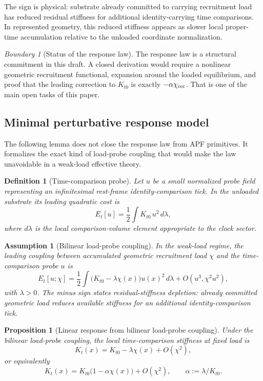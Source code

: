 \documentclass[11pt]{article}
\newtheorem{proposition}[theorem]{Proposition}
\newtheorem{definition}[theorem]{Definition}
\newtheorem{assumption}[theorem]{Assumption}
\theoremstyle{remark}
\newtheorem{warning}[theorem]{Boundary}
\begin{document}
The sign is physical: substrate already committed to carrying recruitment load has reduced residual stiffness for additional identity-carrying time comparisons.  In represented geometry, this reduced stiffness appears as slower local proper-time accumulation relative to the unloaded coordinate normalization.

\begin{warning}[Status of the response law]
The response law is a structural commitment in this draft.  A closed derivation would require a nonlinear geometric recruitment functional, expansion around the loaded equilibrium, and proof that the leading correction to \(K_{t0}\) is exactly \(-\alpha\chi_{\rm rec}\).  That is one of the main open tasks of this paper.
\end{warning}

\subsection{Minimal perturbative response model}

The following lemma does not close the response law from APF primitives.  It formalizes the exact kind of load-probe coupling that would make the law unavoidable in a weak-load effective theory.

\begin{definition}[Time-comparison probe]
Let \(u\) be a small normalized probe field representing an infinitesimal rest-frame identity-comparison tick.  In the unloaded substrate its leading quadratic cost is
\[
        E_t[u]=\frac12\int K_{t0}\,u^2\,d\lambda,
\]
where \(d\lambda\) is the local comparison-volume element appropriate to the clock sector.
\end{definition}

\begin{assumption}[Bilinear load-probe coupling]
In the weak-load regime, the leading coupling between accumulated geometric recruitment load \(\chi\) and the time-comparison probe \(u\) is
\[
        E_t[u;\chi]
        =\frac12\int \bigl(K_{t0}-\lambda\chi(x)\bigr)u(x)^2\,d\lambda
        +O(u^3,\chi^2u^2),
\]
with \(\lambda>0\).  The minus sign states residual-stiffness depletion: already committed geometric load reduces available stiffness for an additional identity-comparison tick.
\end{assumption}

\begin{proposition}[Linear response from bilinear load-probe coupling]
\label{prop:response-from-coupling}
Under the bilinear load-probe coupling, the local time-comparison stiffness at fixed load is
\[
        K_t(x)=K_{t0}-\lambda\chi(x)+O(\chi^2),
\]
or equivalently
\[
        K_t(x)=K_{t0}\bigl(1-\alpha\chi(x)\bigr)+O(\chi^2),
        \qquad \alpha:=\lambda/K_{t0}.
\]
\end{proposition}
\end{document}
